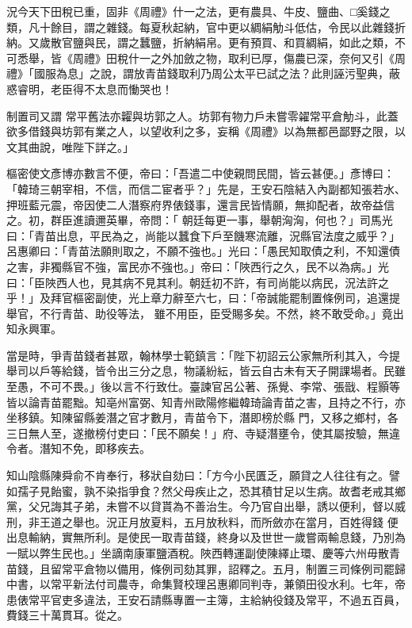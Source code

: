 \begin{pinyinscope}
 況今天下田稅已重，固非《周禮》什一之法，更有農具、牛皮、鹽曲、□奚錢之類，凡十餘目，謂之雜錢。每夏秋起納，官中更以綢絹觔斗低估，令民以此雜錢折納。又歲散官鹽與民，謂之蠶鹽，折納絹帛。更有預買、和買綢絹，如此之類，不可悉舉，皆《周禮》田稅什一之外加斂之物，取利已厚，傷農已深，奈何又引《周禮》「國服為息」之說，謂放青苗錢取利乃周公太平已試之法？此則誣污聖典，蔽惑睿明，老臣得不太息而慟哭也！



 制置司又謂
 常平舊法亦糶與坊郭之人。坊郭有物力戶未嘗零糴常平倉觔斗，此蓋欲多借錢與坊郭有業之人，以望收利之多，妄稱《周禮》以為無都邑鄙野之限，以文其曲說，唯陛下詳之。」



 樞密使文彥博亦數言不便，帝曰：「吾遣二中使親問民間，皆云甚便。」彥博曰：「韓琦三朝宰相，不信，而信二宦者乎？」先是，王安石陰結入內副都知張若水、押班藍元震，帝因使二人潛察府界俵錢事，還言民皆情願，無抑配者，故帝益信之。初，群臣進讀邇英畢，帝問：「
 朝廷每更一事，舉朝洶洶，何也？」司馬光曰：「青苗出息，平民為之，尚能以蠶食下戶至饑寒流離，況縣官法度之威乎？」呂惠卿曰：「青苗法願則取之，不願不強也。」光曰：「愚民知取債之利，不知還債之害，非獨縣官不強，富民亦不強也。」帝曰：「陜西行之久，民不以為病。」光曰：「臣陜西人也，見其病不見其利。朝廷初不許，有司尚能以病民，況法許之乎！」及拜官樞密副使，光上章力辭至六七，曰：「帝誠能罷制置條例司，追還提舉官，不行青苗、助役等法，
 雖不用臣，臣受賜多矣。不然，終不敢受命。」竟出知永興軍。



 當是時，爭青苗錢者甚眾，翰林學士範鎮言：「陛下初詔云公家無所利其入，今提舉司以戶等給錢，皆令出三分之息，物議紛紜，皆云自古未有天子開課場者。民雖至愚，不可不畏。」後以言不行致仕。臺諫官呂公著、孫覺、李常、張戩、程顥等皆以論青苗罷黜。知亳州富弼、知青州歐陽修繼韓琦論青苗之害，且持之不行，亦坐移鎮。知陳留縣姜潛之官才數月，青苗令下，潛即榜於縣
 門，又移之鄉村，各三日無人至，遂撤榜付吏曰：「民不願矣！」府、寺疑潛壅令，使其屬按驗，無違令者。潛知不免，即移疾去。



 知山陰縣陳舜俞不肯奉行，移狀自劾曰：「方今小民匱乏，願貸之人往往有之。譬如孺子見飴蜜，孰不染指爭食？然父母疾止之，恐其積甘足以生病。故耆老戒其鄉黨，父兄誨其子弟，未嘗不以貸貰為不善治生。今乃官自出舉，誘以便利，督以威刑，非王道之舉也。況正月放夏料，五月放秋料，而所斂亦在當月，百姓得錢
 便出息輸納，實無所利。是使民一取青苗錢，終身以及世世一歲嘗兩輸息錢，乃別為一賦以弊生民也。」坐謫南康軍鹽酒稅。陜西轉運副使陳繹止環、慶等六州毋散青苗錢，且留常平倉物以備用，條例司劾其罪，詔釋之。五月，制置三司條例司罷歸中書，以常平新法付司農寺，命集賢校理呂惠卿同判寺，兼領田役水利。七年，帝患俵常平官吏多違法，王安石請縣專置一主簿，主給納役錢及常平，不過五百員，費錢三十萬貫耳。從之。




\end{pinyinscope}
